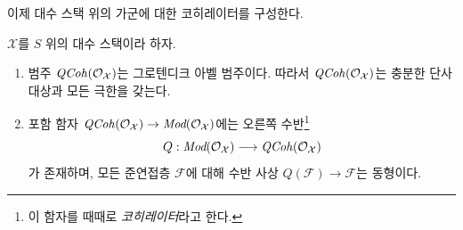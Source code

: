 \noindent
이제 대수 스택 위의 가군에 대한 코히레이터를 구성한다.

\begin{proposition}
\label{proposition-coherator}
$\mathcal{X}$를 $S$ 위의 대수 스택이라 하자.
\begin{enumerate}
\item 범주 $\mathit{QCoh}(\mathcal{O}_\mathcal{X})$는 그로텐디크 아벨
범주이다. 따라서 $\mathit{QCoh}(\mathcal{O}_\mathcal{X})$는 충분한
단사 대상과 모든 극한을 갖는다.
\item 포함 함자
$\mathit{QCoh}(\mathcal{O}_\mathcal{X}) \to
\textit{Mod}(\mathcal{O}_\mathcal{X})$에는 오른쪽 수반\footnote{이
함자를 때때로 {\it 코히레이터}라고 한다.}
$$
Q :
\textit{Mod}(\mathcal{O}_\mathcal{X})
\longrightarrow
\mathit{QCoh}(\mathcal{O}_\mathcal{X})
$$
가 존재하며, 모든 준연접층 $\mathcal{F}$에 대해 수반 사상
$Q(\mathcal{F}) \to \mathcal{F}$는 동형이다.
\end{enumerate}
\end{proposition}


